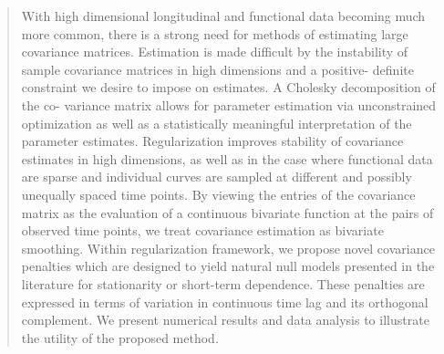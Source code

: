 

\begin{quote}

With high dimensional longitudinal and functional data becoming much more common, there is a strong need for methods of estimating large covariance matrices. Estimation is made difficult by the instability of sample covariance matrices in high dimensions and a positive- definite constraint we desire to impose on estimates. A Cholesky decomposition of the co- variance matrix allows for parameter estimation via unconstrained optimization as well as a statistically meaningful interpretation of the parameter estimates. Regularization improves stability of covariance estimates in high dimensions, as well as in the case where functional data are sparse and individual curves are sampled at different and possibly unequally spaced time points. By viewing the entries of the covariance matrix as the evaluation of a continuous bivariate function at the pairs of observed time points, we treat covariance estimation as bivariate smoothing.
Within regularization framework, we propose novel covariance penalties which are designed to yield natural null models presented in the literature for stationarity or short-term dependence. These penalties are expressed in terms of variation in continuous time lag and its orthogonal complement. We present numerical results and data analysis to illustrate the utility of the proposed method.
\end{quote}


